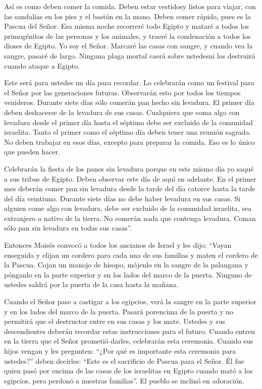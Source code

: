  Así es como deben comer la comida. Deben estar vestidosy
listos para viajar, con las sandalias en los pies y el bastón en la
mano. Deben comer rápido, pues es la Pascua del Señor.  Esa
misma noche recorreré todo Egipto y mataré a todos los primogénitos de
las personas y los animales, y traeré la condenación a todos los dioses
de Egipto. Yo soy el Señor.  Marcaré las casas con sangre,
y cuando vea la sangre, pasaré de largo. Ninguna plaga mortal caerá
sobre ustedesni los destruirá cuando ataque a Egipto.

 Este será para ustedes un día para recordar. Lo celebrarán
como un festival para el Señor por las generaciones futuras. Observarán
esto por todos los tiempos venideros.  Durante siete días
sólo comerán pan hecho sin levadura. El primer día deben deshacerse de
la levadura de sus casas. Cualquiera que coma algo con levadura desde el
primer día hasta el séptimo debe ser excluido de la comunidad israelita.
 Tanto el primer como el séptimo día deben tener una
reunión sagrada. No deben trabajar en esos días, excepto para preparar
la comida. Eso es lo único que pueden hacer.

 Celebrarán la fiesta de los panes sin levadura porque en
este mismo día yo saqué a sus tribus de Egipto. Deben observar este día
de aquí en adelante.  En el primer mes deberán comer pan
sin levadura desde la tarde del día catorce hasta la tarde del día
veintiuno.  Durante siete días no debe haber levadura en
sus casas. Si alguien come algo con levadura, debe ser excluido de la
comunidad israelita, sea extranjero o nativo de la tierra. 
No comerán nada que contenga levadura. Coman sólo pan sin levadura en
todas sus casas''.

 Entonces Moisés convocó a todos los ancianos de Israel y
les dijo: ``Vayan enseguida y elijan un cordero para cada una de sus
familias y maten el cordero de la Pascua.  Cojan un manojo
de hisopo, mójenlo en la sangre de la palangana y pónganlo en la parte
superior y en los lados del marco de la puerta. Ninguno de ustedes
saldrá por la puerta de la casa hasta la mañana.

 Cuando el Señor pase a castigar a los egipcios, verá la
sangre en la parte superior y en los lados del marco de la puerta.
Pasará porencima de la puerta y no permitirá que el destructor entre en
sus casas y los mate.  Ustedes y sus descendientes deberán
recordar estas instrucciones para el futuro.  Cuando entren
en la tierra que el Señor prometió darles, celebrarán esta ceremonia.
 Cuando sus hijos vengan y les pregunten: ``¿Por qué es
importante esta ceremonia para ustedes?''  deben decirles:
``Este es el sacrificio de Pascua para el Señor. Él fue quien pasó por
encima de las casas de los israelitas en Egipto cuando mató a los
egipcios, pero perdonó a nuestras familias''. El pueblo se inclinó en
adoración.

